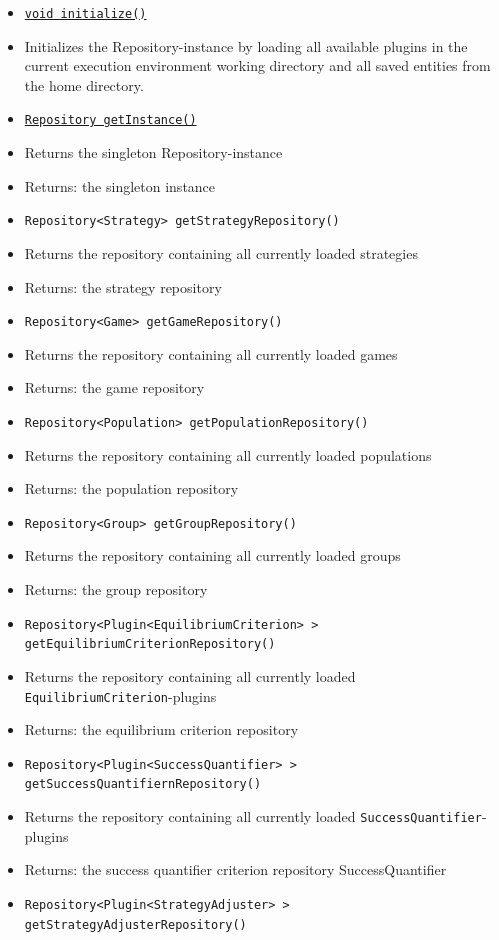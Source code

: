 \documentclass[parskip=full,11pt]{scrartcl}
\begin{document}
\begin{itemize} \itemsep -10pt
	\item \underline{\texttt{void initialize()}}
	\item[] Initializes the Repository-instance by loading all available plugins in the current execution environment working directory and all saved entities from the home directory.
	\item \underline{\texttt{Repository getInstance()}}
	\item[]Returns the singleton Repository-instance
	\item[] Returns: the singleton instance
	\item \texttt{Repository<Strategy> getStrategyRepository()}
	\item[]Returns the repository containing all currently loaded strategies
	\item[] Returns: the strategy repository
	\item \texttt{Repository<Game> getGameRepository()}
	\item[]Returns the repository containing all currently loaded games
	\item[] Returns: the game repository
	\item \texttt{Repository<Population> getPopulationRepository()}
	\item[]Returns the repository containing all currently loaded populations
	\item[] Returns: the population repository
	\item \texttt{Repository<Group> getGroupRepository()}
	\item[]Returns the repository containing all currently loaded groups
	\item[] Returns: the group repository
	\item \texttt{Repository<Plugin<EquilibriumCriterion>\,> getEquilibriumCriterionRepository()}
	\item[]Returns the repository containing all currently loaded \texttt{EquilibriumCriterion}-plugins
	\item[] Returns: the equilibrium criterion repository
	\item\texttt{Repository<Plugin<SuccessQuantifier>\,> getSuccessQuantifiernRepository()}
	\item[]Returns the repository containing all currently loaded \texttt{SuccessQuantifier}-plugins
	\item[] Returns: the success quantifier criterion repository
	SuccessQuantifier
	\item\texttt{Repository<Plugin<StrategyAdjuster>\,> getStrategyAdjusterRepository()}

\end{itemize}
\end{document}
